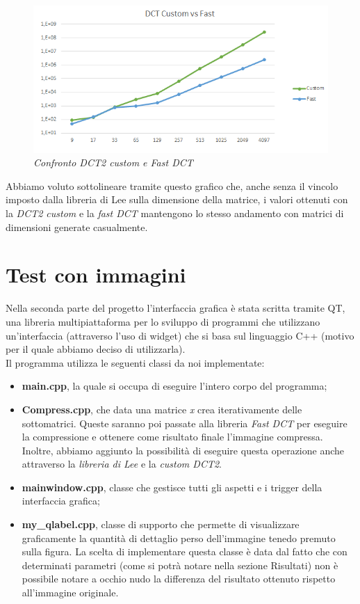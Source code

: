 \documentclass[a4paper,12pt]{report}
\newcommand{\mychapter}[2]{
    \setcounter{chapter}{#1}
    \setcounter{section}{0}
    \chapter*{#2}
    \addcontentsline{toc}{chapter}{#2}
}
\begin{document}
\begin{figure}[H]
\centering
\includegraphics[width=0.77\linewidth]{../img/customvsfast.png}
\caption{\textit{Confronto DCT2 custom e Fast DCT}}
\end{figure}

Abbiamo voluto sottolineare tramite questo grafico che, anche senza il vincolo imposto dalla libreria di Lee sulla dimensione della matrice, i valori ottenuti con la \textit{DCT2 custom} e la \textit{fast DCT} mantengono lo stesso andamento con matrici di dimensioni generate casualmente. 


\mychapter{2}{Test con immagini}
Nella seconda parte del progetto l'interfaccia grafica è stata scritta tramite QT, una libreria multipiattaforma per lo sviluppo di programmi che utilizzano un'interfaccia (attraverso l'uso di widget) che si basa sul linguaggio C++ (motivo per il quale abbiamo deciso di utilizzarla).\\
Il programma utilizza le seguenti classi da noi implementate:
\begin{itemize}
\item \textbf{main.cpp}, la quale si occupa di eseguire l'intero corpo del programma;
\item \textbf{Compress.cpp}, che data una matrice \textit{x} crea iterativamente delle sottomatrici. Queste saranno poi passate alla libreria \textit{Fast DCT} per eseguire la compressione e ottenere come risultato finale l'immagine compressa. Inoltre, abbiamo aggiunto la possibilità di eseguire questa operazione anche attraverso la \textit{libreria di Lee} e la \textit{custom DCT2}.
\item \textbf{mainwindow.cpp}, classe che gestisce tutti gli aspetti e i trigger della interfaccia grafica;
\item \textbf{my\_qlabel.cpp}, classe di supporto che permette di visualizzare graficamente la quantità di dettaglio perso dell'immagine tenedo premuto sulla figura. La scelta di implementare questa classe è data dal fatto che con determinati parametri (come si potrà notare nella sezione Risultati) non è possibile notare a occhio nudo la differenza del risultato ottenuto rispetto all'immagine originale.
\end{itemize}
\end{document}
